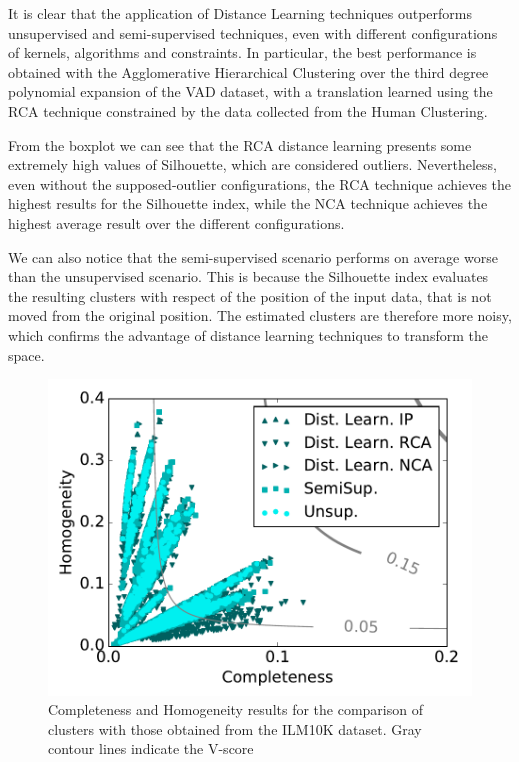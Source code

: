 It is clear that the application of Distance Learning techniques outperforms unsupervised and semi-supervised techniques, even with different configurations of kernels, algorithms and constraints. In particular, the best performance is obtained with the Agglomerative Hierarchical Clustering over the third degree polynomial expansion of the VAD dataset, with a translation learned using the RCA technique constrained by the data collected from the Human Clustering. 

From the boxplot we can see that the RCA distance learning presents some extremely high values of Silhouette, which are considered outliers. Nevertheless, even without the supposed-outlier configurations, the RCA technique achieves the highest results for the Silhouette index, while the NCA technique achieves the highest average result over the different configurations. 

We can also notice that the semi-supervised scenario performs on average worse than the unsupervised scenario. This is because the Silhouette index evaluates the resulting clusters with respect of the position of the input data, that is not moved from the original position. The estimated clusters are therefore more noisy, which confirms the advantage of distance learning techniques to transform the space.


\begin{figure}[tbp]
  \centering %
 \includegraphics[width=.85\columnwidth]{img/ANEW/ILMVscore_square.pdf}
  \caption{Completeness and Homogeneity results for the comparison of clusters with those obtained from the ILM10K dataset. Gray contour lines indicate the V-score}
  \label{fig:ANEWILM10K}
\end{figure}


